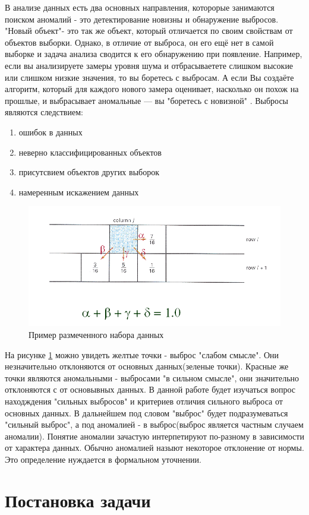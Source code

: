 В анализе данных есть два основных направления, которорые занимаются поиском аномалий - это детектирование новизны и обнаружение выбросов. "Новый объект"- это так же объект, который отличается по своим свойствам от объектов  выборки. Однако, в отличие от выброса, он его ещё нет в самой выборке и задача анализа сводится к его обнаружению при появление. Например, если вы анализируете замеры уровня шума и отбрасываетете слишком высокие или слишком низкие значения, то вы боретесь с выбросам. А если Вы создаёте алгоритм, который для каждого нового замера оценивает, насколько он похож на прошлые, и выбрасывает аномальные — вы "боретесь с новизной"
\cite{Book01}.
Выбросы являются следствием:
\begin{enumerate}
	\item ошибок в данных
	\item неверно классифицированных объектов
	\item присутсвием объектов других выборок
	\item намеренным искажением данных
\end{enumerate}
\begin{figure}
	\centering
	\includegraphics[width=.5\textwidth]{img/1.png}
	\caption{Пример размеченного набора данных}
	\label{fig01}
\end{figure}

На рисунке \ref{fig01} можно увидеть желтые точки - выброс "слабом смысле". Они незначительно отклоняются от основных данных(зеленые точки). Красные же точки являются аномальными - выбросами "в сильном смысле", они значительно  отклоняются с от основывных данных. В данной работе будет изучаться вопрос находждения "сильных выбросов" и  критериев отличия сильного выброса от основных данных. В дальнейшем под словом "выброс" будет подразумеваться "сильный выброс",  а под  аномалией - в выброс(выброс является частным случаем аномалии).
Понятие аномалии зачастую интерпетируют по-разному в зависимости от характера данных. Обычно аномалией назыют некоторое отклонение от нормы. Это определение нуждается в формальном уточнении.

\section{Постановка задачи}

